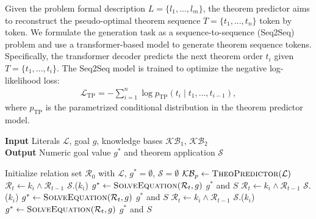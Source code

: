 \documentclass[11pt,a4paper]{article}
\begin{document}
Given the problem formal description $L = \{l_1,...,l_m\}$, the theorem predictor aims to reconstruct the pseudo-optimal theorem  sequence $T = \{t_1,...,t_n\}$ token by token. We formulate the generation task as a sequence-to-sequence (Seq2Seq) problem and use a transformer-based model \cite{lewis2020bart} to generate theorem sequence tokens.  Specifically, the transformer decoder predicts the next theorem order $t_i$ given $T = \{t_1,...,t_i\}$. The Seq2Seq model is trained to optimize the negative log-likelihood loss:
\begin{equation}
\begin{split}
    \mathcal{L}_{\mathrm{TP}} = 
    -\sum_{i=1}^{n} 
    \log p_{\mathrm{TP}}\left(t_{i} \mid t_{1}, \ldots, t_{i-1}\right),
\end{split}
\end{equation}
where $p_{\mathrm{TP}}$ is the parametrized conditional  distribution in the theorem predictor model.

\begin{algorithm}[t]
\caption{Symbolic Geometry Solver}
\label{alg:solver}
\small
\hspace*{0.02in} {\bf Input} 
 Literals $\mathcal{L}$, goal $g$, knowledge bases \hspace*{0.0in}  $\mathcal{KB}_1$, $\mathcal{KB}_2$ \\
\hspace*{0.02in} {\bf Output}
Numeric goal value $g^*$ and theorem application $\mathcal{S}$
\begin{algorithmic}[1]
        \State Initialize relation set $\mathcal{R}_0$ with $\mathcal{L}$, $g^* = \emptyset$, $\mathcal{S} =  \emptyset$
        \State $\mathcal{KB}_p \gets \text{\scshape TheoPredictor}(\mathcal{L})$ 
            \State $\mathcal{R}_{t} \gets k_i \land \mathcal{R}_{t-1}$
            \State $\mathcal{S}$.($k_i$)
        \EndFor
        \State $g^* \gets \text{\scshape SolveEquation}(\mathcal{R}_t, g)$
            \State \Return $g^*$ and $S$
        \EndIf
         
            \State $\mathcal{R}_{t} \gets k_i \land \mathcal{R}_{t-1}$
            \State $\mathcal{S}$.($k_i$)
            \State $g^* \gets \text{\scshape SolveEquation}(\mathcal{R}_t, g)$
                \State \Return $g^*$ and $S$
            \EndIf
        \EndFor
         
            \State $\mathcal{R}_{t} \gets k_i \land \mathcal{R}_{t-1}$
            \State $\mathcal{S}$.($k_i$)
            \State $g^* \gets \text{\scshape SolveEquation}(\mathcal{R}_t, g)$
                \State \Return $g^*$ and $S$
            \EndIf
        \EndFor
        \EndWhile\label{euclidendwhile}
    \EndFunction
\end{algorithmic}
\end{algorithm}
\end{document}
